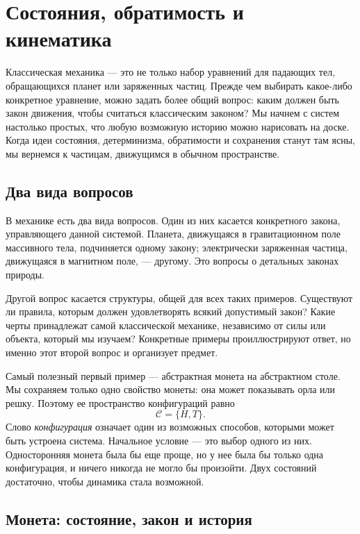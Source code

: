 \chapter{Состояния, обратимость и кинематика}

Классическая механика — это не только набор уравнений для падающих тел, обращающихся планет или заряженных частиц. Прежде чем выбирать какое-либо конкретное уравнение, можно задать более общий вопрос: каким должен быть закон движения, чтобы считаться классическим законом? Мы начнем с систем настолько простых, что любую возможную историю можно нарисовать на доске. Когда идеи состояния, детерминизма, обратимости и сохранения станут там ясны, мы вернемся к частицам, движущимся в обычном пространстве.

\section{Два вида вопросов}

В механике есть два вида вопросов. Один из них касается конкретного закона, управляющего данной системой. Планета, движущаяся в гравитационном поле массивного тела, подчиняется одному закону; электрически заряженная частица, движущаяся в магнитном поле, — другому. Это вопросы о детальных законах природы.

Другой вопрос касается структуры, общей для всех таких примеров. Существуют ли правила, которым должен удовлетворять всякий допустимый закон? Какие черты принадлежат самой классической механике, независимо от силы или объекта, который мы изучаем? Конкретные примеры проиллюстрируют ответ, но именно этот второй вопрос и организует предмет.

Самый полезный первый пример — абстрактная монета на абстрактном столе. Мы сохраняем только одно свойство монеты: она может показывать орла или решку. Поэтому ее пространство конфигураций равно
\begin{equation}
  \mathcal C=\{H,T\}.
\end{equation}
Слово \emph{конфигурация} означает один из возможных способов, которыми может быть устроена система. Начальное условие — это выбор одного из них. Односторонняя монета была бы еще проще, но у нее была бы только одна конфигурация, и ничего никогда не могло бы произойти. Двух состояний достаточно, чтобы динамика стала возможной.

\section{Монета: состояние, закон и история}

